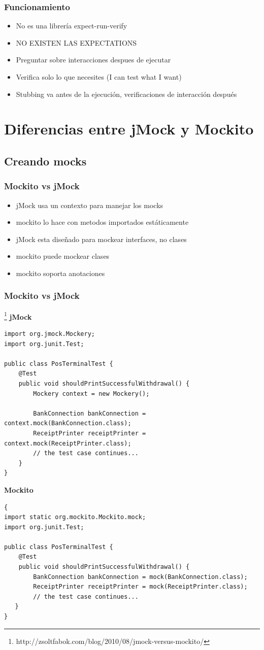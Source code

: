 \documentclass[]{beamer}
\begin{document}
\begin{frame}[c]
  \frametitle{Funcionamiento}
  \begin{itemize}
  \pause \item \alert{No es una librería expect-run-verify}
  \pause \item \alert{NO EXISTEN LAS EXPECTATIONS}
  \pause \item Preguntar sobre interacciones despues de ejecutar
  \pause \item Verifica solo lo que necesites (I can test what I want)
  \pause \item Stubbing va antes de la ejecución, verificaciones de interacción después
  \end{itemize}
\end{frame}

\section{Diferencias entre jMock y Mockito}
\subsection{Creando mocks}
\begin{frame}
\frametitle{Mockito vs jMock}
  \begin{itemize}
  \item jMock usa un contexto para manejar los mocks
  \item mockito lo hace con metodos importados estáticamente
  \item jMock esta diseñado para mockear interfaces, no clases
  \item mockito puede mockear clases
  \item mockito soporta anotaciones
  \end{itemize}
\end{frame}

\begin{frame}[fragile]
\frametitle{Mockito vs jMock}\footnote{http://zsoltfabok.com/blog/2010/08/jmock-versus-mockito/}
\textbf{jMock}
\begin{verbatim}
import org.jmock.Mockery;
import org.junit.Test;

public class PosTerminalTest {
    @Test
    public void shouldPrintSuccessfulWithdrawal() {
        Mockery context = new Mockery();

        BankConnection bankConnection = context.mock(BankConnection.class);
        ReceiptPrinter receiptPrinter = context.mock(ReceiptPrinter.class);
        // the test case continues...
    }
}  
\end{verbatim}
\textbf{Mockito}
\begin{verbatim}{
import static org.mockito.Mockito.mock;
import org.junit.Test;

public class PosTerminalTest {
    @Test
    public void shouldPrintSuccessfulWithdrawal() {
        BankConnection bankConnection = mock(BankConnection.class);
        ReceiptPrinter receiptPrinter = mock(ReceiptPrinter.class);
        // the test case continues...
   }
}
\end{verbatim}
\end{frame}
\end{document}
